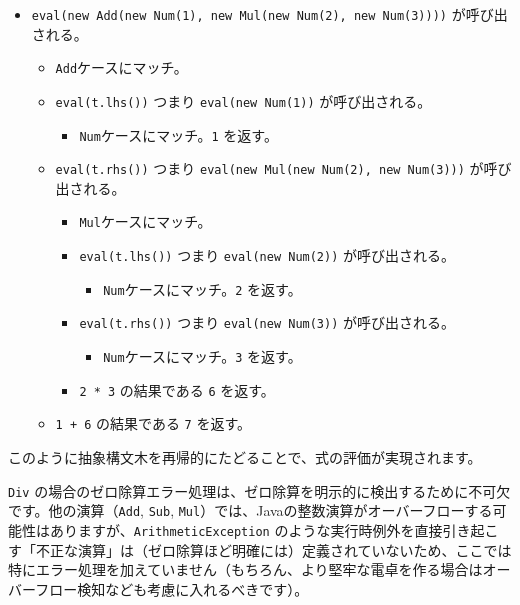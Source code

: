 \begin{itemize}
\item
  \texttt{eval(new\ Add(new\ Num(1),\ new\ Mul(new\ Num(2),\ new\ Num(3))))}
  が呼び出される。

  \begin{itemize}
  \item
    \texttt{Add}ケースにマッチ。
  \item
    \texttt{eval(t.lhs())} つまり \texttt{eval(new\ Num(1))}
    が呼び出される。

    \begin{itemize}
    \item
      \texttt{Num}ケースにマッチ。\texttt{1} を返す。
    \end{itemize}
  \item
    \texttt{eval(t.rhs())} つまり
    \texttt{eval(new\ Mul(new\ Num(2),\ new\ Num(3)))} が呼び出される。

    \begin{itemize}
    \item
      \texttt{Mul}ケースにマッチ。
    \item
      \texttt{eval(t.lhs())} つまり \texttt{eval(new\ Num(2))}
      が呼び出される。

      \begin{itemize}
      \item
        \texttt{Num}ケースにマッチ。\texttt{2} を返す。
      \end{itemize}
    \item
      \texttt{eval(t.rhs())} つまり \texttt{eval(new\ Num(3))}
      が呼び出される。

      \begin{itemize}
      \item
        \texttt{Num}ケースにマッチ。\texttt{3} を返す。
      \end{itemize}
    \item
      \texttt{2\ *\ 3} の結果である \texttt{6} を返す。
    \end{itemize}
  \item
    \texttt{1\ +\ 6} の結果である \texttt{7} を返す。
  \end{itemize}
\end{itemize}

このように抽象構文木を再帰的にたどることで、式の評価が実現されます。

\texttt{Div}
の場合のゼロ除算エラー処理は、ゼロ除算を明示的に検出するために不可欠です。他の演算（\texttt{Add},
\texttt{Sub},
\texttt{Mul}）では、Javaの整数演算がオーバーフローする可能性はありますが、\texttt{ArithmeticException}
のような実行時例外を直接引き起こす「不正な演算」は（ゼロ除算ほど明確には）定義されていないため、ここでは特にエラー処理を加えていません（もちろん、より堅牢な電卓を作る場合はオーバーフロー検知なども考慮に入れるべきです）。

